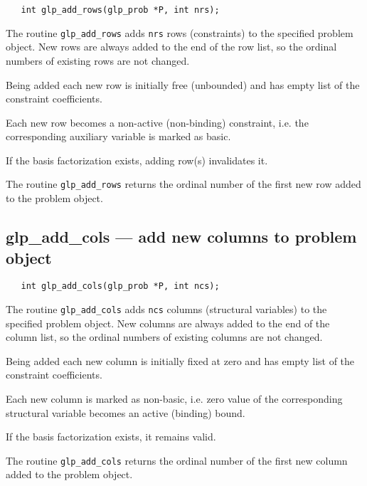 \synopsis

\begin{verbatim}
   int glp_add_rows(glp_prob *P, int nrs);
\end{verbatim}

\description

The routine \verb|glp_add_rows| adds \verb|nrs| rows (constraints) to
the specified problem object. New rows are always added to the end of
the row list, so the ordinal numbers of existing rows are not changed.

Being added each new row is initially free (unbounded) and has empty
list of the constraint coefficients.

Each new row becomes a non-active (non-binding) constraint, i.e. the
corresponding auxiliary variable is marked as basic.

If the basis factorization exists, adding row(s) invalidates it.

\returns

The routine \verb|glp_add_rows| returns the ordinal number of the first
new row added to the problem object.

\subsection{glp\_add\_cols --- add new columns to problem object}

\synopsis

\begin{verbatim}
   int glp_add_cols(glp_prob *P, int ncs);
\end{verbatim}

\description

The routine \verb|glp_add_cols| adds \verb|ncs| columns (structural
variables) to the specified problem object. New columns are always
added to the end of the column list, so the ordinal numbers of existing
columns are not changed.

Being added each new column is initially fixed at zero and has empty
list of the constraint coefficients.

Each new column is marked as non-basic, i.e. zero value of the
corresponding structural variable becomes an active (binding) bound.

If the basis factorization exists, it remains valid.

\returns

The routine \verb|glp_add_cols| returns the ordinal number of the first
new column added to the problem object.

